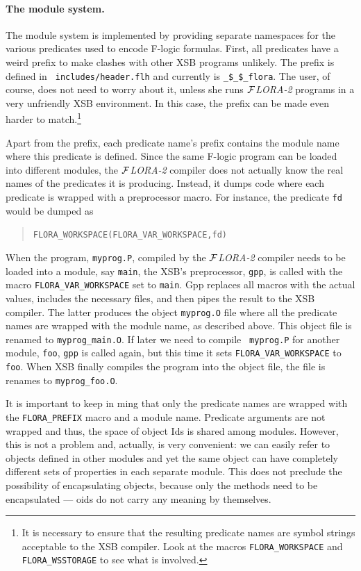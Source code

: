 \documentclass[11pt]{article}
\newcommand{\FLORA}{{\mbox{${\cal F}${\small\it LORA}\rm\emph{-2}}}\xspace}
\newcommand{\fl}{\mbox{F-logic}\xspace}
\begin{document}
\paragraph{The module system.} The module system is implemented by
providing separate namespaces for the various predicates used to encode \fl
formulas. First, all predicates have a weird prefix to make clashes with
other XSB programs unlikely. The prefix is defined in {\tt
  includes/header.flh} and currently is {\tt \_\$\_\$\_flora}. The user, of
course, does not need to worry about it, unless she runs \FLORA programs in
a very unfriendly XSB environment. In this case, the prefix can be made
even harder to match.\footnote{
  It is necessary to ensure that the resulting predicate names are symbol
  strings acceptable to the XSB compiler. Look at the macros
  {\tt FLORA\_WORKSPACE} and {\tt FLORA\_WSSTORAGE} to see what is involved.
  }

Apart from the prefix, each predicate name's prefix contains the module
name where this predicate is defined. Since the same \fl program
can be loaded into different modules, the \FLORA compiler does not actually
know the real names of the predicates it is producing. Instead, it dumps
code where each predicate is wrapped with a preprocessor macro. For
instance, the predicate {\tt fd} would be dumped as
\begin{quote}
 \tt FLORA\_WORKSPACE(FLORA\_VAR\_WORKSPACE,fd)  
\end{quote}
When the program, {\tt myprog.P}, compiled by the \FLORA compiler needs to
be loaded into a module, say {\tt main}, the XSB's preprocessor, {\tt gpp},
is called with the macro {\tt FLORA\_VAR\_WORKSPACE} set to {\tt main}. Gpp
replaces all macros with the actual values, includes the necessary files,
and then pipes the result to the XSB compiler. The latter produces the
object {\tt myprog.O} file where all the predicate names are wrapped with
the module name, as described above.  This object file is renamed to
{\tt myprog\_main.O}. If later we need to compile {\tt 
  myprog.P} for another module, {\tt foo}, {\tt gpp} is called again, but
this time it sets {\tt FLORA\_VAR\_WORKSPACE} to {\tt foo}. When XSB finally
compiles the program into the object file, the file is renames to
{\tt myprog\_foo.O}.

It is important to keep in ming that only the predicate names are wrapped
with the {\tt FLORA\_PREFIX} macro and a module name. Predicate arguments
are not wrapped and thus, the space of object Ids is shared among modules.
However, this is not a problem and, actually, is very convenient: we can
easily refer to objects defined in other modules and yet the same object
can have completely different sets of properties in each separate module.
This does not preclude the possibility of encapsulating objects, because
only the methods need to be encapsulated --- oids do not carry any meaning
by themselves.
\end{document}
